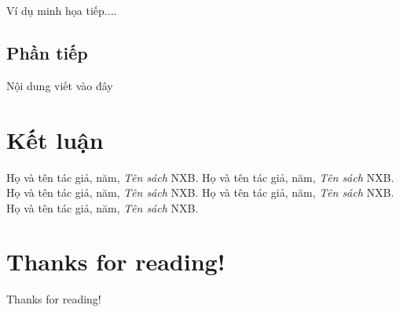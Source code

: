 \documentclass[14pt,a4paper,oneside]{report}		%
\begin{document}
\begin{vd}
Ví dụ minh họa tiếp....
\end{vd}

\section{Phần tiếp}
Nội dung viết vào đây

\chapter*{Kết luận}
\begin{thebibliography}{12}
Họ và tên tác giả, năm, {\it Tên sách} NXB.
Họ và tên tác giả, năm, {\it Tên sách} NXB.
Họ và tên tác giả, năm, {\it Tên sách} NXB.
Họ và tên tác giả, năm, {\it Tên sách} NXB.
Họ và tên tác giả, năm, {\it Tên sách} NXB.
\end{thebibliography}

\chapter*{Thanks for reading!}
Thanks for reading!
\end{document}
